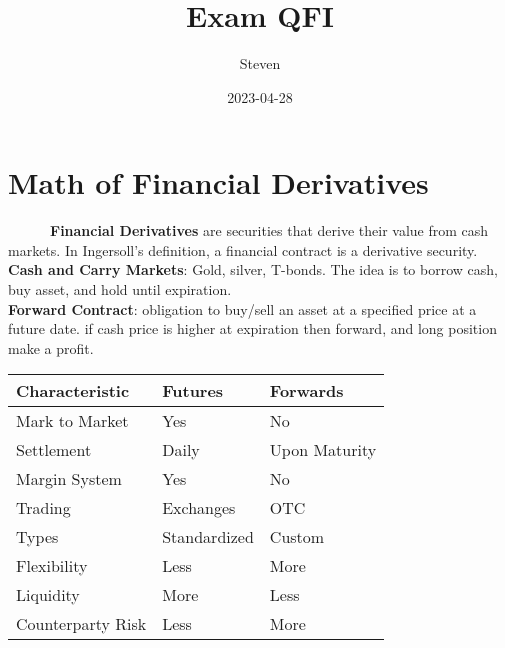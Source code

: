 \documentclass[
  twocolumn]{article}
\title{Exam QFI}
\author{Steven}
\date{2023-04-28}
\begin{document}
\maketitle

{
\setcounter{tocdepth}{2}
\tableofcontents
}
\newpage

\hypertarget{math-of-financial-derivatives}{%
\section{Math of Financial
Derivatives}\label{math-of-financial-derivatives}}

~~~~~~\textbf{Financial Derivatives} are securities that derive their
value from cash markets. In Ingersoll's definition, a financial contract
is a derivative security.\\
\hspace*{0.333em}\hspace*{0.333em}\hspace*{0.333em}\hspace*{0.333em}\hspace*{0.333em}\hspace*{0.333em}\textbf{Cash
and Carry Markets}: Gold, silver, T-bonds. The idea is to borrow cash,
buy asset, and hold until expiration.\\
\hspace*{0.333em}\hspace*{0.333em}\hspace*{0.333em}\hspace*{0.333em}\hspace*{0.333em}\hspace*{0.333em}\textbf{Forward
Contract}: obligation to buy/sell an asset at a specified price at a
future date. if cash price is higher at expiration then forward, and
long position make a profit.

\begin{tabular}{l|l|l}
\hline
Characteristic & Futures & Forwards\\
\hline
Mark to Market & Yes & No\\
\hline
Settlement & Daily & Upon Maturity\\
\hline
Margin System & Yes & No\\
\hline
Trading & Exchanges & OTC\\
\hline
Types & Standardized & Custom\\
\hline
Flexibility & Less & More\\
\hline
Liquidity & More & Less\\
\hline
Counterparty Risk & Less & More\\
\hline
\end{tabular}
\end{document}

